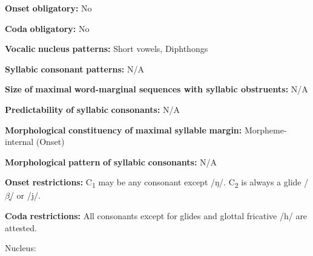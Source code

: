 \documentclass[output=paper]{langsci/langscibook}
\begin{document}
\begin{styleBody}
\textbf{Onset} \textbf{obligatory:} No
\end{styleBody}

\begin{styleBody}
\textbf{Coda} \textbf{obligatory:} No
\end{styleBody}

\begin{styleBody}
\textbf{Vocalic} \textbf{nucleus} \textbf{patterns:} Short vowels, Diphthongs
\end{styleBody}

\begin{styleBody}
\textbf{Syllabic} \textbf{consonant} \textbf{patterns:} N/A
\end{styleBody}

\begin{styleBody}
\textbf{Size} \textbf{of} \textbf{maximal} \textbf{word{}-marginal sequences with syllabic obstruents:} N/A
\end{styleBody}

\begin{styleBody}
\textbf{Predictability} \textbf{of} \textbf{syllabic} \textbf{consonants:} N/A
\end{styleBody}

\begin{styleBody}
\textbf{Morphological} \textbf{constituency} \textbf{of} \textbf{maximal} \textbf{syllable} \textbf{margin:} Morpheme-internal (Onset)
\end{styleBody}

\begin{styleBody}
\textbf{Morphological} \textbf{pattern} \textbf{of} \textbf{syllabic} \textbf{consonants:} N/A
\end{styleBody}

\begin{styleBody}
\textbf{Onset} \textbf{restrictions:} C\textsubscript{1} may be any consonant except /ŋ/. C\textsubscript{2} is always a glide /$\beta ̞$/ or /j/.
\end{styleBody}

\begin{styleBody}
\textbf{Coda} \textbf{restrictions:} All consonants except for glides and glottal fricative /h/ are attested.
\end{styleBody}

\begin{styleBody}
Nucleus:
\end{styleBody}
\end{document}

